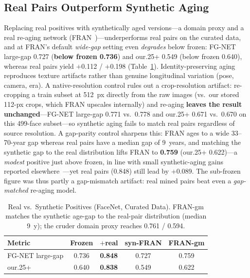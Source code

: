 \documentclass[journal]{IEEEtran}
\begin{document}
\subsection{Real Pairs Outperform Synthetic Aging}\label{sec:res-synth}
Replacing real positives with synthetically aged versions---a domain proxy and a real re-aging network (FRAN~\cite{zoss2022fran})---underperforms real pairs on the curated data, and at FRAN's default \emph{wide-gap} setting even \emph{degrades} below frozen: FG-NET large-gap 0.727 (\textbf{below frozen 0.736}) and our.25+ 0.549 (below frozen 0.640), whereas real pairs yield $+$0.112 / $+$0.198 (Table~\ref{tab:synth}). Identity-preserving aging reproduces texture artifacts rather than genuine longitudinal variation (pose, camera, era). A native-resolution control rules out a crop-resolution artifact: re-cropping a train subset at 512~px directly from the raw images (vs.\ our stored 112-px crops, which FRAN upscales internally) and re-aging \textbf{leaves the result unchanged}---FG-NET large-gap 0.771 vs.\ 0.778 and our.25+ 0.671 vs.\ 0.670 on this 499-face subset---so synthetic aging fails to match real pairs regardless of source resolution. A gap-parity control sharpens this: FRAN ages to a wide 33--70-year gap whereas real pairs have a median gap of 9~years, and matching the synthetic gap to the real distribution lifts FRAN to \textbf{0.759} (our.25+ 0.622)---a \emph{modest} positive just above frozen, in line with small synthetic-aging gains reported elsewhere~\cite{yao2024synthageing}---yet real pairs (0.848) still lead by $+$0.089. The sub-frozen figure was thus partly a gap-mismatch artifact: real mined pairs beat even a \emph{gap-matched} re-aging model.

\begin{table}[!t]
\renewcommand{\arraystretch}{1.15}
\caption{Real vs.\ Synthetic Positives (FaceNet, Curated Data). FRAN-gm matches the synthetic age-gap to the real-pair distribution (median 9~y); the cruder domain proxy reaches 0.761 / 0.594.}
\label{tab:synth}
\centering
\footnotesize
\begin{tabular}{@{}lcccc@{}}
\toprule
Metric & Frozen & $+$real & syn-FRAN & FRAN-gm \\
\midrule
FG-NET large-gap & 0.736 & \textbf{0.848} & 0.727 & 0.759 \\
our.25+ & 0.640 & \textbf{0.838} & 0.549 & 0.622 \\
\bottomrule
\end{tabular}
\end{table}
\end{document}
